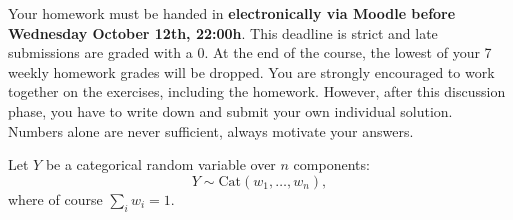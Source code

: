 \documentclass[a4paper,10pt,landscape,twocolumn]{scrartcl}
\newcommand\deadline{Wednesday October 12th, 22:00h}
\begin{document}
\homeworkproblems

{\sffamily\noindent
Your homework must be handed in \textbf{electronically via Moodle before \deadline}.  This deadline is strict and late submissions are graded with a 0. At the end of the course, the lowest of your 7 weekly homework grades will be dropped. You are strongly encouraged to work together on the exercises, including the homework. However, after this discussion phase, you have to write down and submit your own individual solution. Numbers alone are never sufficient, always motivate your answers.
}

\begin{exercise}[]
	Let $Y$ be a categorical random variable over $n$ components:
	\[
		Y \sim \text{Cat}(w_1, \dots, w_n),
	\]
	where of course $\sum_i w_i = 1$. 
\end{exercise}
\end{document}
